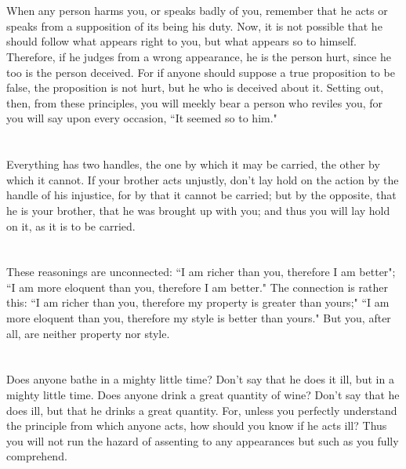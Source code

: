 \documentclass[12pt]{article}
\begin{document}
\section{}

When any person harms you, or speaks badly of you, remember that
he acts or speaks from a supposition of its being his duty. Now, it
is not possible that he should follow what appears right to you, but
what appears so to himself. Therefore, if he judges from a wrong appearance,
he is the person hurt, since he too is the person deceived. For if
anyone should suppose a true proposition to be false, the proposition
is not hurt, but he who is deceived about it. Setting out, then, from
these principles, you will meekly bear a person who reviles you, for
you will say upon every occasion, ``It seemed so to him."

\section{}

Everything has two handles, the one by which it may be carried,
the other by which it cannot. If your brother acts unjustly, don't
lay hold on the action by the handle of his injustice, for by that
it cannot be carried; but by the opposite, that he is your brother,
that he was brought up with you; and thus you will lay hold on it,
as it is to be carried. 

\section{}

These reasonings are unconnected: ``I am richer than you, therefore
I am better"; ``I am more eloquent than you, therefore I am better."
The connection is rather this: ``I am richer than you, therefore my
property is greater than yours;" ``I am more eloquent than you, therefore
my style is better than yours." But you, after all, are neither property
nor style. 

\section{}

Does anyone bathe in a mighty little time? Don't say that he does
it ill, but in a mighty little time. Does anyone drink a great quantity
of wine? Don't say that he does ill, but that he drinks a great quantity.
For, unless you perfectly understand the principle from which anyone
acts, how should you know if he acts ill? Thus you will not run the
hazard of assenting to any appearances but such as you fully comprehend.
\end{document}
